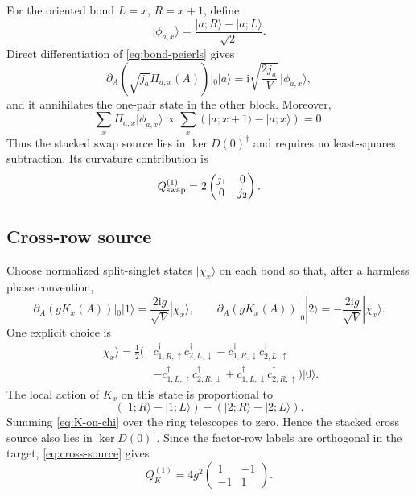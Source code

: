 \documentclass[11pt]{article}
\theoremstyle{remark}
\newcommand{\I}{\mathrm i}
\begin{document}
For the oriented bond $L=x$, $R=x+1$, define
\begin{equation}
 |\phi_{a,x}\rangle
 =\frac{|a;R\rangle-|a;L\rangle}{\sqrt2}.
\end{equation}
Direct differentiation of \eqref{eq:bond-peierls} gives
\begin{equation}
 \partial_A(\sqrt{j_a}\Pi_{a,x}(A))|_0|a\rangle
 =\I\sqrt{\frac{2j_a}{V}}\,|\phi_{a,x}\rangle,
 \label{eq:swap-source}
\end{equation}
and it annihilates the one-pair state in the other block.  Moreover,
\begin{equation}
 \sum_x\Pi_{a,x}|\phi_{a,x}\rangle
 \propto\sum_x(|a;x+1\rangle-|a;x\rangle)=0.
\end{equation}
Thus the stacked swap source lies in $\ker D(0)^\dagger$ and requires no
least-squares subtraction.  Its curvature contribution is
\begin{equation}
 Q_{\rm swap}^{(1)}
 =2\begin{pmatrix}j_1&0\\0&j_2\end{pmatrix}.
 \label{eq:Q-swap}
\end{equation}

\subsection{Cross-row source}

Choose normalized split-singlet states $|\chi_x\rangle$ on each bond so that,
after a harmless phase convention,
\begin{equation}
 \partial_A(gK_x(A))|_0|1\rangle
 =\frac{2\I g}{\sqrt V}|\chi_x\rangle,
 \qquad
 \partial_A(gK_x(A))|_0|2\rangle
 =-\frac{2\I g}{\sqrt V}|\chi_x\rangle.
 \label{eq:cross-source}
\end{equation}
One explicit choice is
\begin{align}
 |\chi_x\rangle=\frac12\bigl(&
 c_{1,R,\uparrow}^\dagger c_{2,L,\downarrow}^\dagger
 -c_{1,R,\downarrow}^\dagger c_{2,L,\uparrow}^\dagger\nonumber\\
 &-c_{1,L,\uparrow}^\dagger c_{2,R,\downarrow}^\dagger
 +c_{1,L,\downarrow}^\dagger c_{2,R,\uparrow}^\dagger
 \bigr)|0\rangle.
 \label{eq:chi-state}
\end{align}
The local action of $K_x$ on this state is proportional to
\begin{equation}
 (|1;R\rangle-|1;L\rangle)
 -( |2;R\rangle-|2;L\rangle).
 \label{eq:K-on-chi}
\end{equation}
Summing \eqref{eq:K-on-chi} over the ring telescopes to zero.  Hence the
stacked cross source also lies in $\ker D(0)^\dagger$.  Since the factor-row
labels are orthogonal in the target, \eqref{eq:cross-source} gives
\begin{equation}
 Q_K^{(1)}
 =4g^2
 \begin{pmatrix}
 1&-1\\
 -1&1
 \end{pmatrix}.
 \label{eq:Q-cross}
\end{equation}
\end{document}
